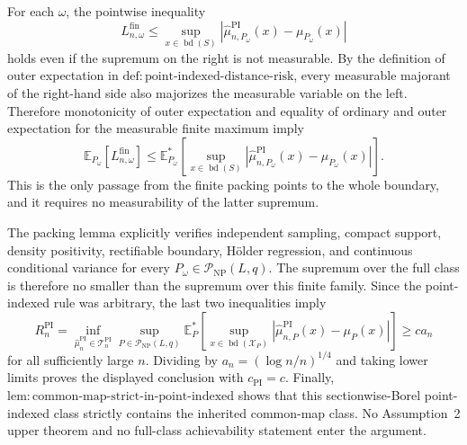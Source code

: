 For each \(\omega\), the pointwise inequality
\[
 L_{n,\omega}^{\mathrm{fin}}
 \leq
 \sup_{x\in\operatorname{bd}(S)}
 \left|
 \widehat\mu_{n,P_\omega}^{\mathrm{PI}}(x)
 -\mu_{P_\omega}(x)
 \right|
\]
holds even if the supremum on the right is not measurable.  By the definition of outer expectation in \(\mathrm{def:point\text{-}indexed\text{-}distance\text{-}risk}\), every measurable majorant of the right-hand side also majorizes the measurable variable on the left.  Therefore monotonicity of outer expectation and equality of ordinary and outer expectation for the measurable finite maximum imply
\[
 \mathbb E_{P_\omega}
 \left[L_{n,\omega}^{\mathrm{fin}}\right]
 \leq
 \mathbb E_{P_\omega}^*\!\left[
 \sup_{x\in\operatorname{bd}(S)}
 \left|
 \widehat\mu_{n,P_\omega}^{\mathrm{PI}}(x)
 -\mu_{P_\omega}(x)
 \right|
 \right].
\]
This is the only passage from the finite packing points to the whole boundary, and it requires no measurability of the latter supremum.

The packing lemma explicitly verifies independent sampling, compact support, density positivity, rectifiable boundary, H\"older regression, and continuous conditional variance for every \(P_\omega\in\mathcal P_{\mathrm{NP}}(L,q)\).  The supremum over the full class is therefore no smaller than the supremum over this finite family.  Since the point-indexed rule was arbitrary, the last two inequalities imply
\[
 R_n^{\mathrm{PI}}
 =\inf_{\widehat\mu_n^{\mathrm{PI}}\in\mathcal T_n^{\mathrm{PI}}}
 \sup_{P\in\mathcal P_{\mathrm{NP}}(L,q)}
 \mathbb E_P^*\!\left[
 \sup_{x\in\operatorname{bd}(\mathcal X_P)}
 \left|\widehat\mu_{n,P}^{\mathrm{PI}}(x)-\mu_P(x)\right|
 \right]
 \geq c a_n
\]
for all sufficiently large \(n\).  Dividing by \(a_n=(\log n/n)^{1/4}\) and taking lower limits proves the displayed conclusion with \(c_{\mathrm{PI}}=c\).  Finally, \(\mathrm{lem:common\text{-}map\text{-}strict\text{-}in\text{-}point\text{-}indexed}\) shows that this sectionwise-Borel point-indexed class strictly contains the inherited common-map class.  No Assumption~2 upper theorem and no full-class achievability statement enter the argument.